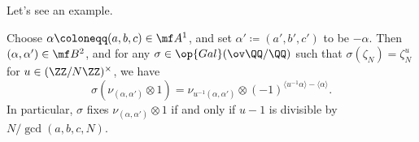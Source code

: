 \documentclass[../thesis.tex]{subfiles}
\begin{document}
Let's see an example.
\begin{corollary} \label{cor:fermat-galois-polarization}
	Choose $\alpha\coloneqq(a,b,c)\in\mf A^1$, and set $\alpha'\coloneqq(a',b',c')$ to be $-\alpha$. Then $(\alpha,\alpha')\in\mf B^2$, and for any $\sigma\in\op{Gal}(\ov\QQ/\QQ)$ such that $\sigma(\zeta_N)=\zeta_N^u$ for $u\in(\ZZ/N\ZZ)^\times$, we have
	\[\sigma(\nu_{(\alpha,\alpha')}\otimes1)=\nu_{u^{-1}(\alpha,\alpha')}\otimes(-1)^{\langle u^{-1}\alpha\rangle-\langle\alpha\rangle}.\]
	In particular, $\sigma$ fixes $\nu_{(\alpha,\alpha')}\otimes1$ if and only if $u-1$ is divisible by $N/\gcd(a,b,c,N)$.
\end{corollary}
\end{document}

